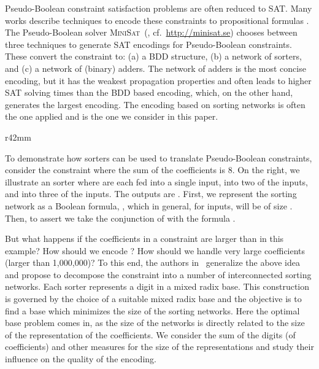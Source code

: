 \documentclass[envcountsame]{llncs}
\newcommand\minisatp{\textsc{MiniSat}}
\begin{document}
Pseudo-Boolean constraint satisfaction problems are often reduced to
SAT. 
Many works describe techniques to encode these constraints to
propositional formulas \cite{BailleuxBR06,BailleuxBR09,EenS06}.
The Pseudo-Boolean solver \minisatp\ (\cite{EenS06}, cf.\
\url{http://minisat.se}) chooses between three techniques to
generate SAT encodings for Pseudo-Boolean constraints. These convert
the constraint to: (a) a BDD structure, (b) a network of sorters, and
(c) a network of (binary) adders. The network of adders is the most
concise encoding, but it has the weakest propagation properties and
often leads to higher SAT solving times
than the BDD based encoding, which, on the other hand,
generates the largest encoding. The encoding based on sorting networks
is often the one applied and is the one we consider in this paper.

\begin{wrapfigure}{r}{42mm}\vspace{-10mm}
  \begin{center}\scriptsize  
     
  \end{center}
\vspace{-11mm}
\end{wrapfigure}
To demonstrate how sorters can be used to translate Pseudo-Boolean
constraints, consider the constraint  where the sum of the coefficients is 8. On the right, we
illustrate an  sorter where  are each fed into
a single input,  into two of the inputs, and  into three of
the inputs. The outputs are .  First, we represent the
sorting network as a Boolean formula, , which in general, for
 inputs, will be of size  \cite{Batcher68}. Then, to
assert  we take the conjunction of  with the formula
.

But what happens if the coefficients in a constraint are larger than
in this example?  How should we encode 
?  How should we
handle very large coefficients (larger than 1,000,000)? To this end,
the authors in~\cite{EenS06} generalize the above idea and propose 
to decompose the constraint into a number of interconnected
sorting networks. Each sorter represents a digit in a mixed radix
base.
This construction is governed by the choice of a suitable mixed radix
base and the objective is to find a base which minimizes the size of
the sorting networks. 
Here the optimal base problem comes in, as the size of the
networks is directly related to the size of the representation of the
coefficients. We consider the sum of the digits (of coefficients)
and other measures for the size of the representations
and study their influence on the quality of the encoding.
\end{document}
